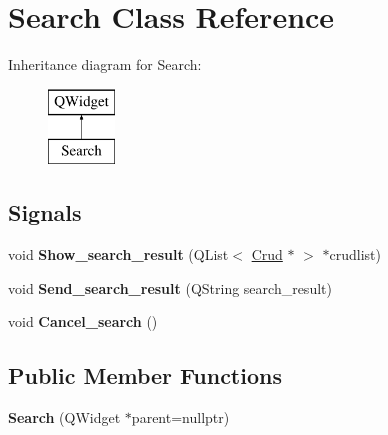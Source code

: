 \hypertarget{class_search}{}\section{Search Class Reference}
\label{class_search}
Inheritance diagram for Search\+:\begin{figure}[H]
\begin{center}
\leavevmode
\includegraphics[height=2.000000cm]{class_search}
\end{center}
\end{figure}
\subsection*{Signals}
\begin{DoxyCompactItemize}
\item 
\mbox{\label{class_search_abdc0900c57ba48f53595da20be7a7d02}} 
void {\bfseries Show\+\_\+search\+\_\+result} (Q\+List$<$ \mbox{\hyperlink{class_crud}{Crud}} $\ast$ $>$ $\ast$crudlist)
\item 
\mbox{\label{class_search_a1be7e21dce8b64beb82b4611a2b364e9}} 
void {\bfseries Send\+\_\+search\+\_\+result} (Q\+String search\+\_\+result)
\item 
\mbox{\label{class_search_ad193f4827f652b417fe4fe86f94adf71}} 
void {\bfseries Cancel\+\_\+search} ()
\end{DoxyCompactItemize}
\subsection*{Public Member Functions}
\begin{DoxyCompactItemize}
\item 
\mbox{\label{class_search_a7010bf2c93cc36c96a19ae568a58fb28}} 
{\bfseries Search} (Q\+Widget $\ast$parent=nullptr)
\end{DoxyCompactItemize}
